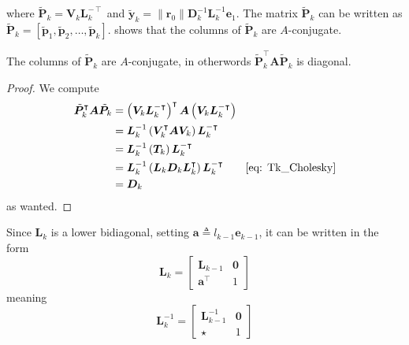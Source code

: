 where $\tilde{\bm{P}}_k = \bm{V}_{k} \bm{L}_k^{-\intercal}$ and $\tilde{\bm{y}}_k = \| \bm{r}_0 \| \bm{D}_k^{-1} \bm{L}_k^{-1} \bm{e}_1$. The matrix $\tilde{\bm{P}}_k$ can be written as
$\tilde{\bm{P}}_k = \left[ \tilde{\bm{p}}_1 , \tilde{\bm{p}}_2 , \ldots , \tilde{\bm{p}}_k \right]$.  shows that the columns of $\tilde{\bm{P}}_k$ are $A$-conjugate.

\begin{lem} \label{lemma: Pk_cols_A_conj}
    The columns of $\tilde{\bm{P}}_k$ are $A$-conjugate, in otherwords $\tilde{\bm{P}}_k^{\intercal} \bm{A} \tilde{\bm{P}}_k$ is diagonal.
\end{lem}

\begin{proof}
    We compute
    \begin{align*}
        \tilde{\bm{P}}_k^{\intercal} \bm{A} \tilde{\bm{P}}_k
         & = \left( \bm{V}_{k} \bm{L}_k^{-\intercal} \right)^{\intercal} \bm{A} \left( \bm{V}_{k} \bm{L}_k^{-\intercal} \right)      \\
         & = \bm{L}_k^{-1} \left( \bm{V}_{k}^{\intercal} \bm{A} \bm{V}_{k} \right) \bm{L}_k^{-\intercal}                             \\
         & = \bm{L}_k^{-1} \left( \bm{T}_k \right) \bm{L}_k^{-\intercal}                                                             \\
         & = \bm{L}_k^{-1} \left( \bm{L}_k \bm{D}_k \bm{L}_k^{\intercal} \right) \bm{L}_k^{-\intercal} \tag*{\Cref{eq: Tk_Cholesky}} \\
         & = \bm{D}_k
    \end{align*}
    as wanted.
\end{proof}

Since $\bm{L}_k$ is a lower bidiagonal, setting $\bm{a} \triangleq l_{k-1} \bm{e}_{k-1}$, it can be written in the form
\[
    \bm{L}_k =
    \begin{bmatrix}
        \bm{L}_{k-1}       & \bm{0} \\
        \bm{a}^{\intercal} & 1
    \end{bmatrix}
\]
meaning
\[
    \bm{L}_k^{-1} =
    \begin{bmatrix}
        \bm{L}_{k-1}^{-1} & \bm{0} \\
        \star             & 1
    \end{bmatrix}
\]


